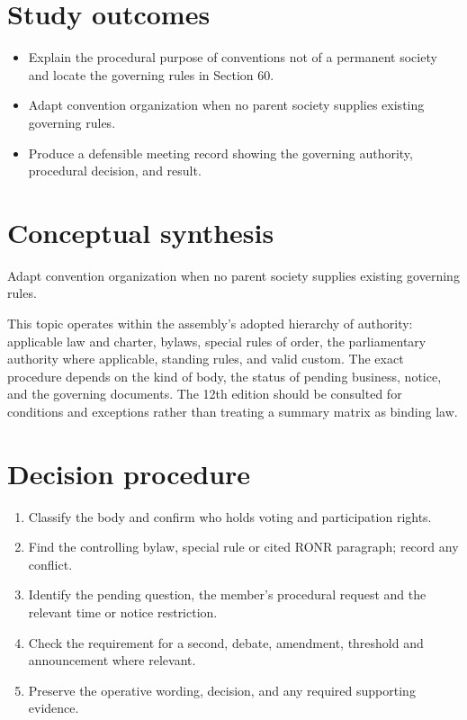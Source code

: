 \documentclass[11pt]{article}
\begin{document}
\SuiteOpen
{}
\section{Study outcomes}
\begin{itemize}[leftmargin=*,itemsep=4pt]
\item Explain the procedural purpose of conventions not of a permanent society and locate the governing rules in Section 60.
\item Adapt convention organization when no parent society supplies existing governing rules.
\item Produce a defensible meeting record showing the governing authority, procedural decision, and result.
\end{itemize}

\section{Conceptual synthesis}
Adapt convention organization when no parent society supplies existing governing rules.

This topic operates within the assembly’s adopted hierarchy of authority: applicable law and charter, bylaws, special rules of order, the parliamentary authority where applicable, standing rules, and valid custom. The exact procedure depends on the kind of body, the status of pending business, notice, and the governing documents. The 12th edition should be consulted for conditions and exceptions rather than treating a summary matrix as binding law.
\section{Decision procedure}
\begin{enumerate}[leftmargin=*,itemsep=4pt]
\item Classify the body and confirm who holds voting and participation rights.
\item Find the controlling bylaw, special rule or cited RONR paragraph; record any conflict.
\item Identify the pending question, the member’s procedural request and the relevant time or notice restriction.
\item Check the requirement for a second, debate, amendment, threshold and announcement where relevant.
\item Preserve the operative wording, decision, and any required supporting evidence.
\end{enumerate}
\end{document}
